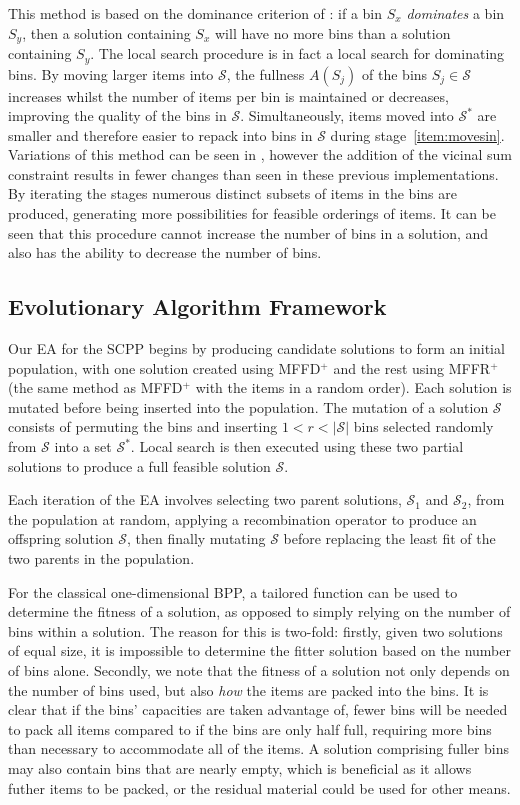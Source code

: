 \documentclass[authoryear]{elsarticle}
\begin{document}
This method is based on the dominance criterion of \citet{martello1990l}: if a bin $S_x$ \emph{dominates} a bin $S_y$, then a solution containing $S_x$ will have no more bins than a solution containing $S_y$. The local search procedure is in fact a local search for dominating bins. By moving larger items into $\mathcal{S}$, the fullness $A(S_j)$ of the bins $S_j \in \mathcal{S}$ increases whilst the number of items per bin is maintained or decreases, improving the quality of the bins in $\mathcal{S}$. Simultaneously, items moved into $\mathcal{S}^*$ are smaller and therefore easier to repack into bins in $\mathcal{S}$ during stage~\ref{item:movesin}. Variations of this method can be seen in \citet{lewis2009, lewis2017, falkenauer1996, levine2004}, however the addition of the vicinal sum constraint results in fewer changes than seen in these previous implementations. By iterating the stages numerous distinct subsets of items in the bins are produced, generating more possibilities for feasible orderings of items. It can be seen that this procedure cannot increase the number of bins in a solution, and also has the ability to decrease the number of bins.


\subsection{Evolutionary Algorithm Framework}
\label{sub:eaframework}
\noindent Our EA for the SCPP begins by producing candidate solutions to form an initial population, with one solution created using MFFD$^+$ and the rest using MFFR$^+$ (the same method as MFFD$^+$ with the items in a random order). Each solution is mutated before being inserted into the population. The mutation of a solution $\mathcal{S}$ consists of permuting the bins and inserting $1 < r < |\mathcal{S}|$ bins selected randomly from $\mathcal{S}$ into a set $\mathcal{S}^*$. Local search is then executed using these two partial solutions to produce a full feasible solution $\mathcal{S}$. 

Each iteration of the EA involves selecting two parent solutions, $\mathcal{S}_1$ and $\mathcal{S}_2$, from the population at random, applying a recombination operator to produce an offspring solution $\mathcal{S}$, then finally mutating $\mathcal{S}$ before replacing the least fit of the two parents in the population.

For the classical one-dimensional BPP, a tailored function can be used to determine the fitness of a solution, as opposed to simply relying on the number of bins within a solution. The reason for this is two-fold: firstly, given two solutions of equal size, it is impossible to determine the fitter solution based on the number of bins alone. Secondly, we note that the fitness of a solution not only depends on the number of bins used, but also \emph{how} the items are packed into the bins. It is clear that if the bins' capacities are taken advantage of, fewer bins will be needed to pack all items compared to if the bins are only half full, requiring more bins than necessary to accommodate all of the items. A solution comprising fuller bins may also contain bins that are nearly empty, which is beneficial as it allows futher items to be packed, or the residual material could be used for other means.
\end{document}
